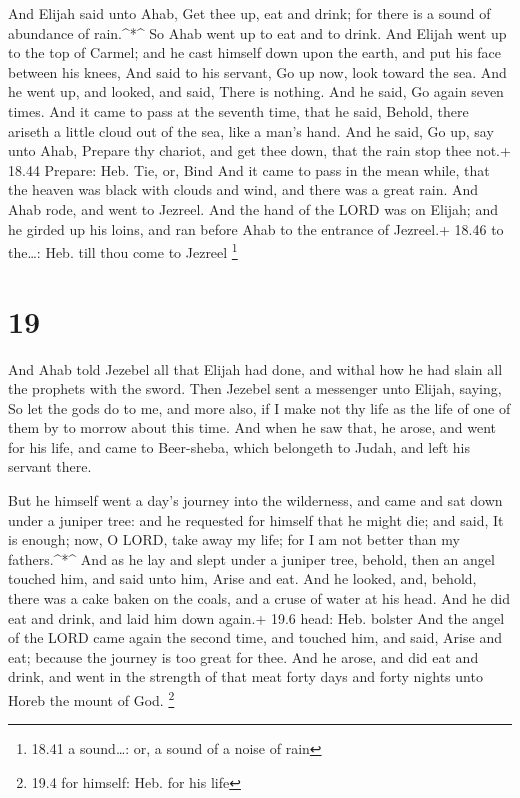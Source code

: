  And Elijah said unto Ahab, Get thee up, eat and drink; for
there is a sound of abundance of rain.\^{}*\^{}  So Ahab
went up to eat and to drink. And Elijah went up to the top of Carmel;
and he cast himself down upon the earth, and put his face between his
knees,  And said to his servant, Go up now, look toward the
sea. And he went up, and looked, and said, There is nothing. And he
said, Go again seven times.  And it came to pass at the
seventh time, that he said, Behold, there ariseth a little cloud out of
the sea, like a man's hand. And he said, Go up, say unto Ahab, Prepare
thy chariot, and get thee down, that the rain stop thee not.+ 18.44
Prepare: Heb. Tie, or, Bind  And it came to pass in the
mean while, that the heaven was black with clouds and wind, and there
was a great rain. And Ahab rode, and went to Jezreel.  And
the hand of the LORD was on Elijah; and he girded up his loins, and ran
before Ahab to the entrance of Jezreel.+ 18.46 to the\ldots: Heb. till
thou come to Jezreel \footnote{18.41 a sound\ldots: or, a sound of a
  noise of rain}

\hypertarget{section-18}{%
\section{19}\label{section-18}}

 And Ahab told Jezebel all that Elijah had done, and withal
how he had slain all the prophets with the sword.  Then
Jezebel sent a messenger unto Elijah, saying, So let the gods do to me,
and more also, if I make not thy life as the life of one of them by to
morrow about this time.  And when he saw that, he arose, and
went for his life, and came to Beer-sheba, which belongeth to Judah, and
left his servant there.

 But he himself went a day's journey into the wilderness,
and came and sat down under a juniper tree: and he requested for himself
that he might die; and said, It is enough; now, O LORD, take away my
life; for I am not better than my fathers.\^{}*\^{}  And as
he lay and slept under a juniper tree, behold, then an angel touched
him, and said unto him, Arise and eat.  And he looked, and,
behold, there was a cake baken on the coals, and a cruse of water at his
head. And he did eat and drink, and laid him down again.+ 19.6 head:
Heb. bolster  And the angel of the LORD came again the
second time, and touched him, and said, Arise and eat; because the
journey is too great for thee.  And he arose, and did eat
and drink, and went in the strength of that meat forty days and forty
nights unto Horeb the mount of God. \footnote{19.4 for himself: Heb. for
  his life}

